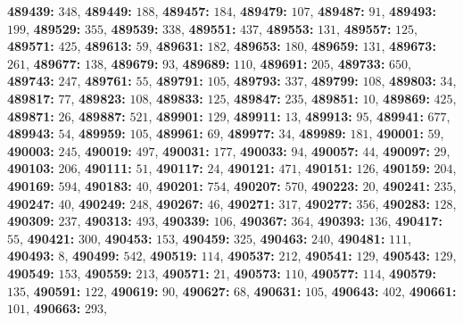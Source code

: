 \textsf{\bfseries 489439:} $348$, \textsf{\bfseries 489449:} $188$, \textsf{\bfseries 489457:} $184$, \textsf{\bfseries 489479:} $107$, \textsf{\bfseries 489487:} $91$, \textsf{\bfseries 489493:} $199$, \textsf{\bfseries 489529:} $355$, \textsf{\bfseries 489539:} $338$, \textsf{\bfseries 489551:} $437$, \textsf{\bfseries 489553:} $131$, \textsf{\bfseries 489557:} $125$, \textsf{\bfseries 489571:} $425$, \textsf{\bfseries 489613:} $59$, \textsf{\bfseries 489631:} $182$, \textsf{\bfseries 489653:} $180$, \textsf{\bfseries 489659:} $131$, \textsf{\bfseries 489673:} $261$, \textsf{\bfseries 489677:} $138$, \textsf{\bfseries 489679:} $93$, \textsf{\bfseries 489689:} $110$, \textsf{\bfseries 489691:} $205$, \textsf{\bfseries 489733:} $650$, \textsf{\bfseries 489743:} $247$, \textsf{\bfseries 489761:} $55$, \textsf{\bfseries 489791:} $105$, \textsf{\bfseries 489793:} $337$, \textsf{\bfseries 489799:} $108$, \textsf{\bfseries 489803:} $34$, \textsf{\bfseries 489817:} $77$, \textsf{\bfseries 489823:} $108$, \textsf{\bfseries 489833:} $125$, \textsf{\bfseries 489847:} $235$, \textsf{\bfseries 489851:} $10$, \textsf{\bfseries 489869:} $425$, \textsf{\bfseries 489871:} $26$, \textsf{\bfseries 489887:} $521$, \textsf{\bfseries 489901:} $129$, \textsf{\bfseries 489911:} $13$, \textsf{\bfseries 489913:} $95$, \textsf{\bfseries 489941:} $677$, \textsf{\bfseries 489943:} $54$, \textsf{\bfseries 489959:} $105$, \textsf{\bfseries 489961:} $69$, \textsf{\bfseries 489977:} $34$, \textsf{\bfseries 489989:} $181$, \textsf{\bfseries 490001:} $59$, \textsf{\bfseries 490003:} $245$, \textsf{\bfseries 490019:} $497$, \textsf{\bfseries 490031:} $177$, \textsf{\bfseries 490033:} $94$, \textsf{\bfseries 490057:} $44$, \textsf{\bfseries 490097:} $29$, \textsf{\bfseries 490103:} $206$, \textsf{\bfseries 490111:} $51$, \textsf{\bfseries 490117:} $24$, \textsf{\bfseries 490121:} $471$, \textsf{\bfseries 490151:} $126$, \textsf{\bfseries 490159:} $204$, \textsf{\bfseries 490169:} $594$, \textsf{\bfseries 490183:} $40$, \textsf{\bfseries 490201:} $754$, \textsf{\bfseries 490207:} $570$, \textsf{\bfseries 490223:} $20$, \textsf{\bfseries 490241:} $235$, \textsf{\bfseries 490247:} $40$, \textsf{\bfseries 490249:} $248$, \textsf{\bfseries 490267:} $46$, \textsf{\bfseries 490271:} $317$, \textsf{\bfseries 490277:} $356$, \textsf{\bfseries 490283:} $128$, \textsf{\bfseries 490309:} $237$, \textsf{\bfseries 490313:} $493$, \textsf{\bfseries 490339:} $106$, \textsf{\bfseries 490367:} $364$, \textsf{\bfseries 490393:} $136$, \textsf{\bfseries 490417:} $55$, \textsf{\bfseries 490421:} $300$, \textsf{\bfseries 490453:} $153$, \textsf{\bfseries 490459:} $325$, \textsf{\bfseries 490463:} $240$, \textsf{\bfseries 490481:} $111$, \textsf{\bfseries 490493:} $8$, \textsf{\bfseries 490499:} $542$, \textsf{\bfseries 490519:} $114$, \textsf{\bfseries 490537:} $212$, \textsf{\bfseries 490541:} $129$, \textsf{\bfseries 490543:} $129$, \textsf{\bfseries 490549:} $153$, \textsf{\bfseries 490559:} $213$, \textsf{\bfseries 490571:} $21$, \textsf{\bfseries 490573:} $110$, \textsf{\bfseries 490577:} $114$, \textsf{\bfseries 490579:} $135$, \textsf{\bfseries 490591:} $122$, \textsf{\bfseries 490619:} $90$, \textsf{\bfseries 490627:} $68$, \textsf{\bfseries 490631:} $105$, \textsf{\bfseries 490643:} $402$, \textsf{\bfseries 490661:} $101$, \textsf{\bfseries 490663:} $293$, 
